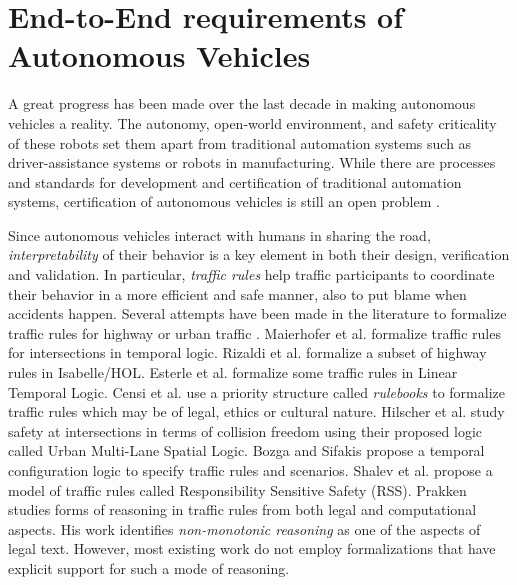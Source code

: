 \section{End-to-End requirements of Autonomous Vehicles}

A great progress has been made over the last decade in making autonomous vehicles a reality.
%
The autonomy, open-world environment, and safety criticality of these robots set them apart from traditional automation systems such as driver-assistance systems or robots in manufacturing.
%
While there are processes and standards for development and certification of traditional automation systems, certification of autonomous vehicles is still an open problem \cite{Zhao.2022}.



Since autonomous vehicles interact with humans in sharing the road, \emph{interpretability} of their behavior is a key element in both their design, verification and validation.
%
In particular, \emph{traffic rules} help traffic participants to coordinate their behavior in a more efficient and safe manner, also to put blame when accidents happen.
%
Several attempts have been made in the literature to formalize traffic rules for highway or urban traffic \cite{Bin.2022,arechiga2019specifying,Corso.2020,Esterle.2020,Maierhofer.2020,Hekmatnejad.2019,Cho.2019,Sahin.2020,Censi.2019}.
%
Maierhofer et al. \cite{Maierhofer.2022} formalize traffic rules for intersections in temporal logic.
%
Rizaldi et al. \cite{Rizaldi.2015,Rizaldi.2017} formalize a subset of highway rules in Isabelle/HOL.
%
Esterle et al. \cite{Esterle.2019,Esterle.2020} formalize some traffic rules in Linear Temporal Logic.
%
Censi et al. \cite{Censi.2019} use a priority structure called \emph{rulebooks} to formalize traffic rules which may be of legal, ethics or cultural nature.
%
Hilscher et al. \cite{Hilscher.2016} study safety at intersections in terms of collision freedom using their proposed logic called Urban Multi-Lane Spatial Logic.
%
Bozga and Sifakis \cite{Bozga.2021} propose a temporal configuration logic to specify traffic rules and scenarios.
%
Shalev et al. \cite{Shalev.2017} propose a model of traffic rules called Responsibility Sensitive Safety (RSS).
%
Prakken \cite{Prakken.2017} studies forms of reasoning in traffic rules from both legal and computational aspects.
%
His work identifies \emph{non-monotonic reasoning} as one of the aspects of legal text.
%
However, most existing work do not employ formalizations that have explicit support for such a mode of reasoning.


